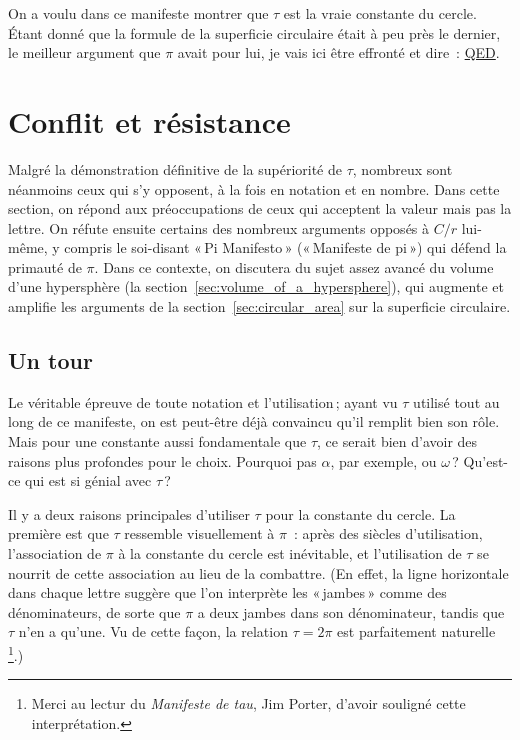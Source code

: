 On a voulu dans ce manifeste montrer que $\tau$ est la vraie constante du cercle. Étant donné que la formule de la superficie circulaire était à peu près le dernier, le meilleur argument que $\pi$ avait pour lui, je vais ici être effronté et dire~: \href{https://fr.wikipedia.org/wiki/CQFD_(math%C3%A9matiques)}{QED}.



\section{Conflit et résistance} %
\label{sec:conflict_and_resistance}

Malgré la démonstration définitive de la supériorité de $\tau$, nombreux sont néanmoins ceux qui s'y opposent, à la fois en notation et en nombre. Dans cette section, on répond aux préoccupations de ceux qui acceptent la valeur mais pas la lettre. On réfute ensuite certains des nombreux arguments opposés à $C/r$ lui-même, y compris le soi-disant «\,Pi Manifesto\,» («\,Manifeste de pi\,») qui défend la primauté de $\pi$. Dans ce contexte, on discutera du sujet assez avancé du volume d'une hypersphère (la section~\ref{sec:volume_of_a_hypersphere}), qui augmente et amplifie les arguments de la section~\ref{sec:circular_area} sur la superficie circulaire.

  \subsection{Un tour} %
  \label{sec:one_turn}

Le véritable épreuve de toute notation et l'utilisation\,; ayant vu $\tau$ utilisé tout au long de ce manifeste, on est peut-être déjà convaincu qu'il remplit bien son rôle. Mais pour une constante aussi fondamentale que $\tau$, ce serait bien d'avoir des raisons plus profondes pour le choix. Pourquoi pas $\alpha$, par exemple, ou $\omega$\,? Qu'est-ce qui est si génial avec $\tau$\,?

Il y a deux raisons principales d'utiliser $\tau$ pour la constante du cercle. La première est que $\tau$ ressemble visuellement à $\pi$~: après des siècles d'utilisation, l'association de $\pi$ à la constante du cercle est inévitable, et l'utilisation de $\tau$ se nourrit de cette association au lieu de la combattre. (En effet, la ligne horizontale dans chaque lettre suggère que l'on interprète les «\,jambes\,» comme des dénominateurs, de sorte que $\pi$ a deux jambes dans son dénominateur, tandis que $\tau$ n'en a qu'une. Vu de cette façon, la relation $\tau = 2\pi$ est parfaitement naturelle\,\footnote{Merci au lectur du \emph{Manifeste de tau}, Jim Porter, d'avoir souligné cette interprétation.}.)

